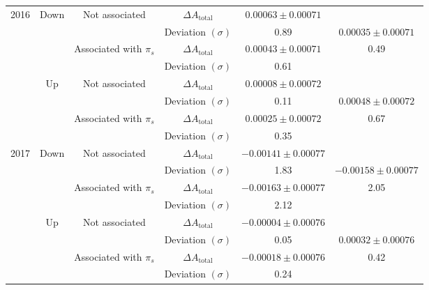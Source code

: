 \documentclass{article}
\begin{document}
\begin{center}
\begin{tabular}{c|c|c|c|c|c}
                        \multirow{8}{*}{2016} & \multirow{4}{*}{Down} & \multirow{2}{*}{Not associated} & $\Delta A_\text{total}$ & $0.00063\pm 0.00071$& \\
                        & & & Deviation $(\sigma)$ & 0.89& $0.00035\pm 0.00071$ \\
                        \cline{3-5}
                        & & \multirow{2}{*}{Associated with $\pi_s$} & $\Delta A_\text{total}$ & $0.00043\pm 0.00071$& 0.49\\
                        & & & Deviation $(\sigma)$ & 0.61& \\
                        \cline{2-6}
                        & \multirow{4}{*}{Up} & \multirow{2}{*}{Not associated} & $\Delta A_\text{total}$ & $0.00008\pm 0.00072$& \\
                        & & & Deviation $(\sigma)$ & 0.11& $0.00048\pm 0.00072$\\
                        \cline{3-5}
                        & & \multirow{2}{*}{Associated with $\pi_s$} & $\Delta A_\text{total}$ & $0.00025\pm 0.00072$& 0.67\\
                        & & & Deviation $(\sigma)$ & 0.35& \\
                        \hline

                        \multirow{8}{*}{2017} & \multirow{4}{*}{Down} & \multirow{2}{*}{Not associated} & $\Delta A_\text{total}$ & $-0.00141\pm 0.00077$& \\
                        & & & Deviation $(\sigma)$ & 1.83& $-0.00158\pm 0.00077$\\
                        \cline{3-5}
                        & & \multirow{2}{*}{Associated with $\pi_s$} & $\Delta A_\text{total}$ & $-0.00163\pm 0.00077$& 2.05\\
                        & & & Deviation $(\sigma)$ & 2.12& \\
                        \cline{2-6}
                        & \multirow{4}{*}{Up} & \multirow{2}{*}{Not associated} & $\Delta A_\text{total}$ & $-0.00004\pm 0.00076$& \\
                        & & & Deviation $(\sigma)$ & 0.05& $0.00032\pm 0.00076$\\
                        \cline{3-5}
                        & & \multirow{2}{*}{Associated with $\pi_s$} & $\Delta A_\text{total}$ & $-0.00018\pm 0.00076$& 0.42\\
                        & & & Deviation $(\sigma)$ & 0.24& \\
                        \hline


\end{tabular}
\end{center}
\end{document}
